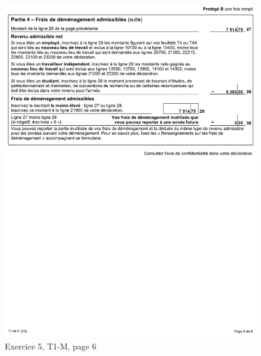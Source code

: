 \begin{figure}
	\centering
	\includegraphics[width=.9\textwidth]{exercice/3-5/Q5/T1-M-p6.png}
	\caption{Exercice 5, T1-M, page 6}
	\label{fig:chap3Exercice5T1M6}
\end{figure}

